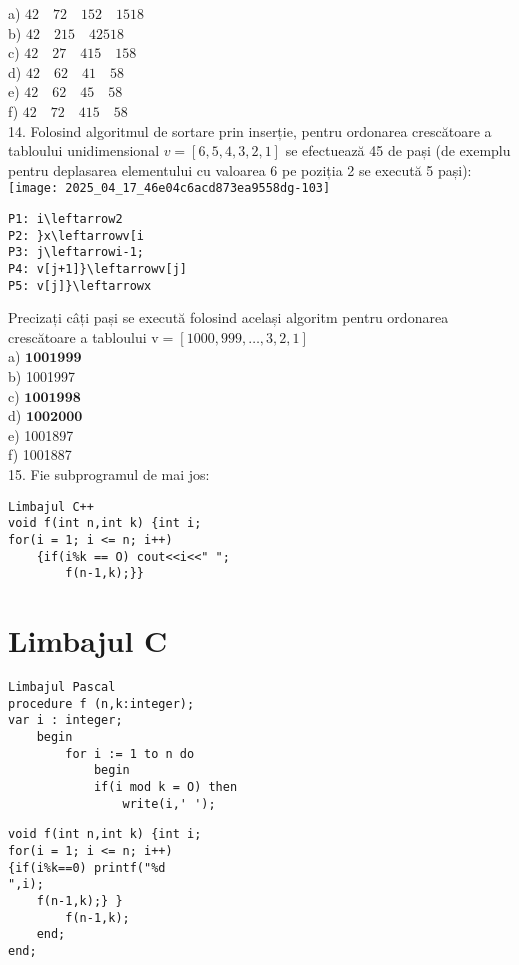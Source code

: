 a) $42 \quad 72 \quad 152 \quad 1518$\\
b) $42 \quad 215 \quad 42518$\\
c) $42 \quad 27 \quad 415 \quad 158$\\
d) $42 \quad 62 \quad 41 \quad 58$\\
e) $42 \quad 62 \quad 45 \quad 58$\\
f) $42 \quad 72 \quad 415 \quad 58$\\
14. Folosind algoritmul de sortare prin inserție, pentru ordonarea crescătoare a tabloului unidimensional $v=[6,5,4,3,2,1]$ se efectuează 45 de pași (de exemplu pentru deplasarea elementului cu valoarea 6 pe poziția 2 se execută 5 pași):\\
\texttt{[image: 2025\_04\_17\_46e04c6acd873ea9558dg-103]}

\begin{verbatim}
P1: i\leftarrow2
P2: }x\leftarrowv[i
P3: j\leftarrowi-1;
P4: v[j+1]}\leftarrowv[j]
P5: v[j]}\leftarrowx
\end{verbatim}

Precizați câți pași se execută folosind același algoritm pentru ordonarea crescătoare a tabloului $\mathrm{v}=[1000,999, \ldots, 3,2,1]$\\
a) $\mathbf{1 0 0 1 9 9 9}$\\
b) 1001997\\
c) $\mathbf{1 0 0 1 9 9 8}$\\
d) $\mathbf{1 0 0 2 0 0 0}$\\
e) 1001897\\
f) 1001887\\
15. Fie subprogramul de mai jos:

\begin{verbatim}
Limbajul C++
void f(int n,int k) {int i;
for(i = 1; i <= n; i++)
    {if(i%k == O) cout<<i<<" ";
        f(n-1,k);}}
\end{verbatim}

\section*{Limbajul C}
\begin{verbatim}
Limbajul Pascal
procedure f (n,k:integer);
var i : integer;
    begin
        for i := 1 to n do
            begin
            if(i mod k = O) then
                write(i,' ');
\end{verbatim}

\begin{verbatim}
void f(int n,int k) {int i;
for(i = 1; i <= n; i++)
{if(i%k==0) printf("%d
",i);
    f(n-1,k);} }
        f(n-1,k);
    end;
end;
\end{verbatim}

